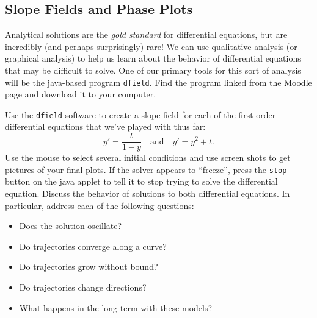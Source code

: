\subsection{Slope Fields and Phase Plots}
        Analytical solutions are the {\it gold standard} for differential equations, but are
    incredibly (and perhaps surprisingly) rare! We can use qualitative analysis (or
    graphical analysis) to help us learn about the behavior of differential equations that
    may be difficult to solve. One of our primary tools for this sort of analysis
    will be the java-based program \texttt{dfield}.  Find the program linked from the
    Moodle page and download it to your computer.

    \begin{problem}
        Use the \texttt{dfield} software to create a slope field for each of the first
        order differential equations that we've played with thus far:
        \[ y' = \frac{t}{1-y} \quad \text{and} \quad y'=y^2+t. \]
        Use the mouse to select several initial conditions and use screen shots to get
        pictures of your final plots.  If the solver appears to ``freeze'', press the
        \texttt{stop} button on the java applet to tell it to stop trying to solve the
        differential equation. Discuss the behavior of solutions to both differential
        equations.  In particular, address each of the following questions:
        \begin{itemize}
            \item Does the solution oscillate?
            \item Do trajectories converge along a curve?
            \item Do trajectories grow without bound?
            \item Do trajectories change directions?
            \item What happens in the long term with these models?
        \end{itemize}
    \end{problem}

% 

